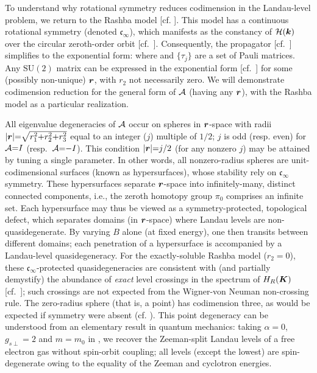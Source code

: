 \documentclass[aps, showpacs, twocolumn, notitlepage, superscriptaddress]{revtex4-1}
\begin{document}
To understand why rotational symmetry reduces codimension in the Landau-level problem, we return to the Rashba model [cf. ]. This model has a continuous rotational symmetry (denoted $\mathfrak{c}_{\infty}$), which manifests as the constancy of ${\cal H}(\boldsymbol{k})$ over the circular zeroth-order orbit [cf.\ ]. Consequently, the propagator [cf.\ ] simplifies to the exponential form:
where
and $\{\tau_j\}$ are a set of Pauli matrices. Any $\text{SU}(2)$ matrix can be expressed in the exponential form [cf.\ ] for some (possibly non-unique) $\boldsymbol{r}$, with $r_2$ not necessarily zero. We will demonstrate codimension reduction for the general form of ${\cal A}$ (having any $\boldsymbol{r}$), with the Rashba model as a particular realization.

All eigenvalue degeneracies of ${\cal A}$ occur on spheres in $\boldsymbol{r}$-space with radii $|\boldsymbol{r}|{=}\sqrt{r_1^2{+}r_2^2{+}r_3^2}$ equal to an integer ($j$)  multiple of $1/2$;  ${j}$ is odd (resp. even) for  ${\cal A}{=}I$ (resp.\ ${\cal A}{=}{-}I$).  This condition $|\boldsymbol{r}|{=}j/2$ (for any nonzero $j$) may be attained by tuning a single parameter. In other words, all nonzero-radius spheres are unit-codimensional surfaces (known as hypersurfaces), whose stability rely on $\mathfrak{c}_{\infty}$ symmetry. These hypersurfaces separate $\boldsymbol{r}$-space into infinitely-many, distinct connected components, i.e., the zeroth homotopy group $\pi_0$ comprises an infinite set. Each hypersurface may thus be viewed as a symmetry-protected, topological defect, which separates domains (in $\boldsymbol{r}$-space) where Landau levels are non-quasidegenerate. By varying $B$ alone (at fixed energy), one then transits between different domains; each penetration of a hypersurface is accompanied by a Landau-level quasidegeneracy. For the exactly-soluble Rashba model ($r_2{=}0$), these $\mathfrak{c}_{\infty}$-protected quasidegeneracies  are consistent with (and partially demystify)  the abundance of \textit{exact} level crossings in the spectrum of $H_R(\boldsymbol{K})$ [cf.\ ]; such crossings are not expected from the Wigner-von Neuman non-crossing rule\cite{neumann2000behaviour}. The zero-radius sphere (that is, a point) has codimension three, as would be expected if symmetry were absent (cf. ). This point degeneracy can be understood from an elementary result in quantum mechanics: taking $\alpha{=}0$, $g_{s\perp}{=}2$ {and} $m{=}m_0$ in , we recover the Zeeman-split Landau levels of a free electron gas without spin-orbit coupling; all levels (except the lowest) are spin-degenerate owing to the equality of the Zeeman and cyclotron energies\cite{landau2013course}.
\end{document}
